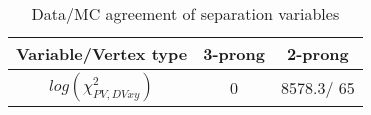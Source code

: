 \documentclass{article}
\begin{document}
\begin{table}[htbp]
\caption{\label{tab:sepVars}Data/MC agreement of separation variables}
\begin{center}
\begin{tabular}{c|c|c}
Variable/Vertex type & 3-prong & 2-prong\\
\hline
$log(\chi^{2}_{PV,DV xy})$ & 0 & 8578.3/ 65\\
\hline
\end{tabular}
\end{center}
\end{table}
\end{document}
